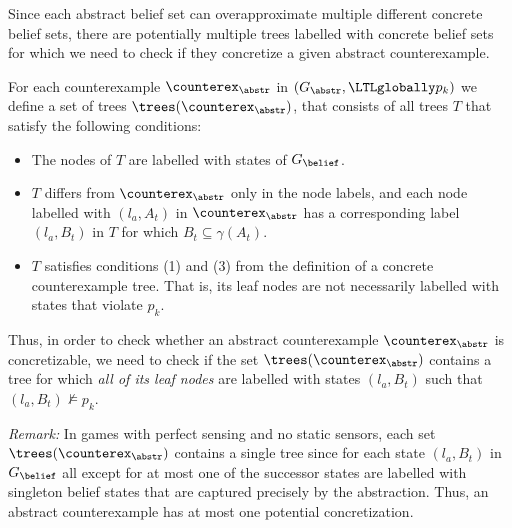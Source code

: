\bigskip

Since each abstract belief set can overapproximate multiple different concrete belief sets, there are potentially multiple trees labelled with concrete belief sets for which we need to check if they concretize a given abstract counterexample.

For each counterexample $\counterex_\abstr$ in $(G_\abstr,\LTLglobally p_k)$ we define a set of trees $\trees(\counterex_\abstr)$, that consists of all trees $T$ that satisfy the following conditions:
\begin{itemize}
    \item The nodes of $T$ are labelled with states of $G_\belief$.
    \item $T$ differs from $\counterex_\abstr$ only in the node labels, and each node labelled with $(l_a,A_t)$ in $\counterex_\abstr$ has a corresponding label $(l_a, B_t)$ in $T$ for which $B_t \subseteq \gamma(A_t)$.
    \item $T$ satisfies conditions (1) and (3) from the definition of a concrete counterexample tree. That is, its leaf nodes are not necessarily labelled with states that violate $p_k$.
\end{itemize}


Thus, in order to check whether an abstract counterexample $\counterex_\abstr$ is concretizable, we need to check if the set $\trees(\counterex_\abstr)$ contains a tree for which \emph{all of its leaf nodes} are labelled with states $(l_a, B_t)$ such that $(l_a,B_t) \not \models p_k$.

\emph{Remark:} In games with perfect sensing and no static sensors, each set $\trees(\counterex_\abstr)$ contains a single tree since for each state $(l_a,B_t)$ in $G_\belief$ all except for at most one of the successor states are labelled with singleton belief states that are captured precisely by the abstraction. Thus, an abstract counterexample has at most one potential concretization.